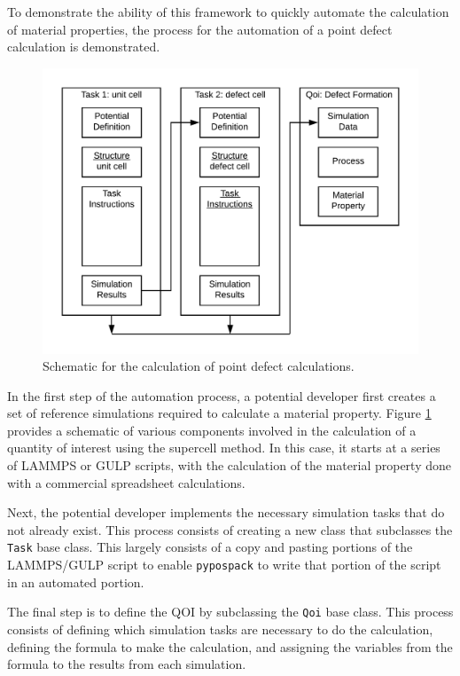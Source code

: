 To demonstrate the ability of this framework to quickly automate the calculation of material properties, the process for the automation of a point defect calculation is demonstrated.

\begin{figure}[ht]
	\centering
	\includegraphics[width=5in]{chapter6/img/fig_point_defect}
	\caption{Schematic for the calculation of point defect calculations.}
	\label{fig_point_defect_calculation}
\end{figure}

In the first step of the automation process, a potential developer first creates a set of reference simulations required to calculate a material property.  Figure \ref{fig_point_defect_calculation} provides a schematic of various components involved in the calculation of a quantity of interest using the supercell method.  In this case, it starts at a series of LAMMPS or GULP scripts, with the calculation of the material property done with a commercial spreadsheet calculations.

Next, the potential developer implements the necessary simulation tasks that do not already exist.  This process consists of creating a new class that subclasses the \verb|Task| base class.  This largely consists of a copy and pasting portions of the LAMMPS/GULP script to enable \verb|pypospack| to write that portion of the script in an automated portion.

The final step is to define the QOI by subclassing the \verb|Qoi| base class.  This process consists of defining which simulation tasks are necessary to do the calculation, defining the formula to make the calculation, and assigning the variables from the formula to the results from each simulation.

